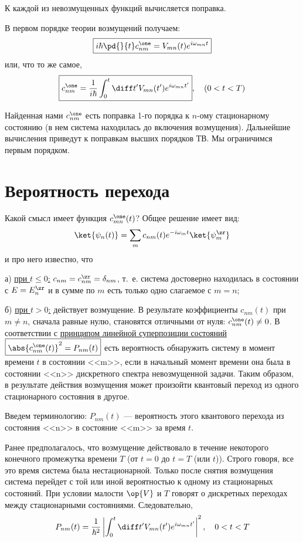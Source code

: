 К каждой из невозмущенных функций вычисляется поправка.

В первом порядке теории возмущений получаем:
\begin{equation}
\label{eq:13_1_5}
\boxed{i \hbar \pd{}{t} c_{nm}^\one = V_{mn}(t) e^{i \omega_{mn} t}}
\end{equation} 
или, что то же самое,
\begin{equation*}
\boxed{c_{nm}^\one = \frac{1}{i\hbar} \int_0^t \diff t' V_{mn}(t') e^{i \omega_{mn} t'}}, ~~~(0 < t < T)
\end{equation*}

Найденная нами $c_{nm}^\one$ есть поправка 1-го порядка к $n$-ому стационарному состоянию (в нем система находилась до включения возмущения). Дальнейшие вычисления приведут к поправкам высших порядков ТВ. Мы ограничимся первым порядком.

\section{Вероятность перехода}

Какой смысл имеет функция $c_{mn}^\one (t)$? Общее решение имеет вид:
$$
\ket{\psi_n(t)} = \sum_m c_{nm}(t) e^{-i \omega_m t} \ket{\psi_m^\zr}
$$
и про него известно, что

а) \underline{при $t \le 0$:} $c_{nm} = c_{nm}^\zr = \delta_{nm}$, т.~е. система достоверно находилась в состоянии с $E=E_n^\zr$ и в сумме по $m$ есть только одно слагаемое с $m = n$;

б) \underline{при $t > 0$:} действует возмущение. В результате коэффициенты $c_{nm}(t)$ при $m \neq n$, сначала равные нулю, становятся отличными от нуля: $c_{nm}^\one(t) \neq 0$. В соответствии с \underline{принципом линейной суперпозиции состояний} $\boxed{\abs{c_{nm}^\one (t)}^2 = P_{nm}(t)}$ есть вероятность обнаружить систему в момент времени $t$ в состоянии <<m>>, если в начальный момент времени она была в состоянии <<n>> дискретного спектра невозмущенной задачи. Таким образом, в результате действия возмущения может произойти квантовый переход из одного стационарного состояния в другое.

Введем терминологию: $P_{nm}(t)$ --- вероятность этого квантового перехода из состояния <<n>> в состояние <<m>> за время $t$. 

Ранее предполагалось, что возмущение действовало в течение некоторого конечного промежутка времени $T$ (от $t = 0$ до $t = T$ (или $t$)). Строго говоря, все это время система была нестационарной. Только после снятия возмущения система перейдет с той или иной вероятностью к одному из стационарных состояний. При условии малости $\op{V}$ и $T$ говорят о дискретных переходах между стационарными состояниями. Следовательно,  
$$
P_{nm}(t) =\frac{1}{\hbar^2} \left | \int_0^t \diff t' V_{mn}(t') e^{i \omega_{mn} t'} \right |^2, ~~~0 < t < T
$$

